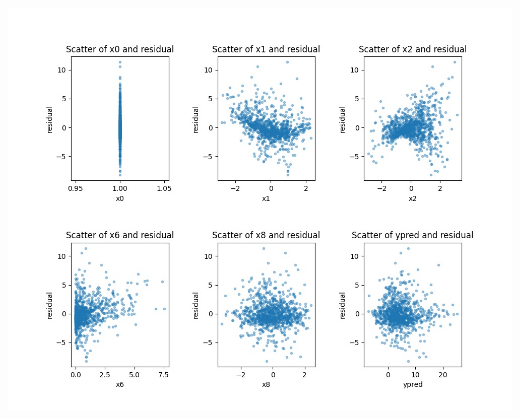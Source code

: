 \documentclass{article}
\begin{document}
\begin{center}
\includegraphics[width = 1\textwidth]{images/Scatter_res1.jpg}
\end{center}

%
%
%
%
%
%
%
%
%
\newpage
\end{document}
